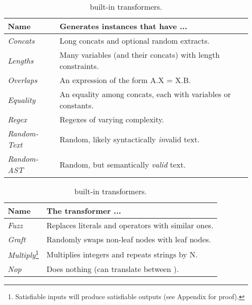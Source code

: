 \begin{table}[t]
    \caption{\fuzzer{} built-in (a) generators and (b) transformers.}
    \begin{subtable}{1\textwidth}
        \centering
        \caption{\generator{} built-in generators.}
        \label{tbl:generators}
        \begin{tabular}{ l l }
            \toprule
            \textbf{Name}
            & \textbf{Generates instances that have ...} \\
            \midrule
            \textit{Concats}
            & Long concats and optional random extracts. \\
            \textit{Lengths}
            & Many variables (and their concats) with length constraints. \\
            \textit{Overlaps}
            & An expression of the form A.X = X.B. \\
            \textit{Equality}
            & An equality among concats, each with variables or constants. \\
            \textit{Regex}
            & Regexes of varying complexity. \\
            \textit{Random-Text}
            & Random, likely syntactically \textit{in}valid text. \\
            \textit{Random-AST}
            & Random, but semantically \textit{valid} text. \\
            \bottomrule
        \end{tabular}
    \end{subtable}
    \begin{subtable}{1\textwidth}
        \centering
        \caption{\transformer{} built-in transformers.}
        \label{tbl:transformers}
        \begin{tabular}{l l}
            \toprule
            \textbf{Name}
            & \textbf{The transformer ...} \\
            \midrule
            \textit{Fuzz}
            & Replaces literals and operators with similar ones.\\
            \textit{Graft}
            & Randomly swaps non-leaf nodes with leaf nodes.\\
            \textit{Multiply}\footnote{Satisfiable inputs 
            will produce satisfiable outputs (see Appendix for proof).}
            & Multiplies integers and repeats strings by N.\\
            \textit{Nop}
            & Does nothing (can translate between \smtfull{}).\\

\end{tabular}
\end{subtable}
\end{table}
